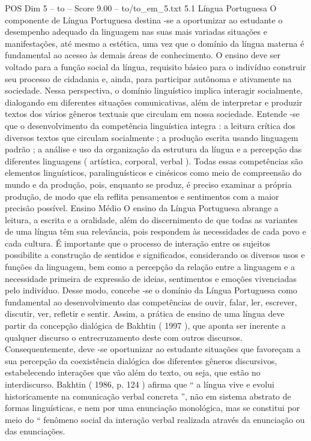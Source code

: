 \begin{textsample}{POS Dim 5 – to – Score 9.00 – to/to\_em\_5.txt}  \label{ex:f5_pos_029}
5.1 Língua Portuguesa O componente de Língua Portuguesa destina -se a oportunizar ao estudante o desempenho adequado da linguagem nas suas mais variadas situações e manifestações, até mesmo a estética, uma vez que o domínio da língua materna é fundamental ao acesso às demais áreas de conhecimento.
O ensino deve ser voltado para a função social da língua, requisito básico para o indivíduo construir seu processo de cidadania e, ainda, para participar autônoma e ativamente na sociedade.
Nessa perspectiva, o domínio linguístico implica interagir socialmente, dialogando em diferentes situações comunicativas, além de interpretar e produzir textos dos vários gêneros textuais que circulam em nossa sociedade.
Entende -se que o desenvolvimento da competência linguística integra : a leitura crítica dos diversos textos que circulam socialmente ; a produção escrita usando linguagem padrão ; a análise e uso da organização da estrutura da língua e a percepção das diferentes linguagens ( artística, corporal, verbal ).
Todas essas competências são elementos linguísticos, paralinguísticos e cinésicos como meio de compreensão do mundo e da produção, pois, enquanto se produz, é preciso examinar a própria produção, de modo que ela reflita pensamentos e sentimentos com a maior precisão possível.
Ensino Médio O ensino da Língua Portuguesa abrange a leitura, a escrita e a oralidade, além do discernimento de que todas as variantes de uma língua têm sua relevância, pois respondem às necessidades de cada povo e cada cultura.
É importante que o processo de interação entre os sujeitos possibilite a construção de sentidos e significados, considerando os diversos usos e funções da linguagem, bem como a percepção da relação entre a linguagem e a necessidade primeira de expressão de ideias, sentimentos e emoções vivenciadas pelo indivíduo.
Desse modo, concebe -se o domínio da Língua Portuguesa como fundamental ao desenvolvimento das competências de ouvir, falar, ler, escrever, discutir, ver, refletir e sentir.
Assim, a prática de ensino de uma língua deve partir da concepção dialógica de Bakhtin ( 1997 ), que aponta ser inerente a qualquer discurso o entrecruzamento deste com outros discursos.
Consequentemente, deve -se oportunizar ao estudante situações que favoreçam a sua percepção da coexistência dialógica dos diferentes gêneros discursivos, estabelecendo interações que vão além do texto, ou seja, que estão no interdiscurso.
Bakhtin ( 1986, p. 124 ) afirma que “ a língua vive e evolui historicamente na comunicação verbal concreta ”, não em sistema abstrato de formas linguísticas, e nem por uma enunciação monológica, mas se constitui por meio do “ fenômeno social da interação verbal realizada através da enunciação ou das enunciações.

\end{textsample}
